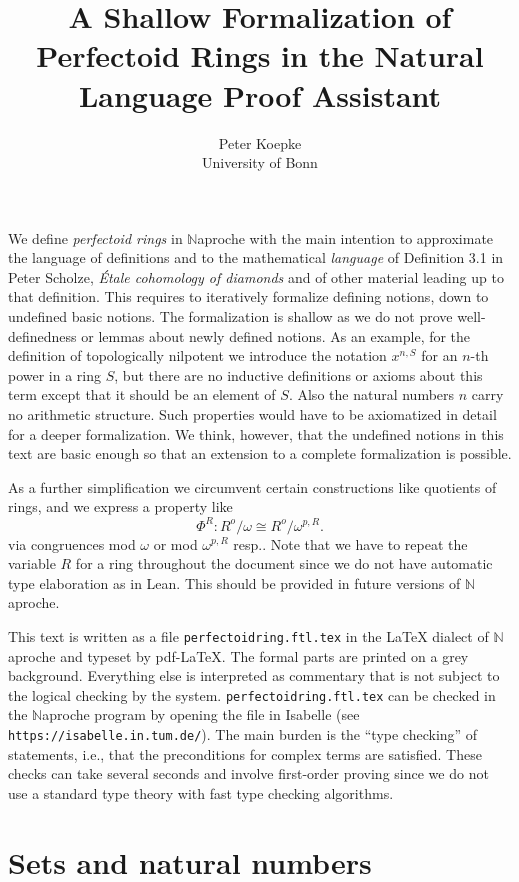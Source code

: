 \documentclass{article}
\title{A Shallow Formalization of Perfectoid Rings in the
\Naproche{} Natural Language Proof Assistant}
\author{Peter Koepke\\
University of Bonn}
\newcommand{\Naproche}{$\mathbb{N}$aproche}
\begin{document}
\maketitle

We define \textit{perfectoid rings} in \Naproche{} with the main intention to approximate
the language of definitions and
to the mathematical \textit{language} of Definition 3.1 in
Peter Scholze, \textit{Étale cohomology of diamonds} and of other material leading up
to that definition.
This requires to iteratively formalize
defining notions, down to undefined basic notions.
The formalization is shallow as we do not prove well-definedness or lemmas about
newly defined notions. As an example, for the definition of topologically nilpotent
we introduce the notation $x^{n,S}$ for an $n$-th power in a ring $S$, but there are
no inductive definitions or axioms about this term except that it should be an element
of $S$. Also the natural numbers $n$ carry no arithmetic structure.
Such properties would have to be axiomatized in detail for a deeper formalization.
We think, however, that the undefined notions in this text are basic enough so that an
extension to a complete formalization is possible.

As a further simplification we circumvent certain constructions like quotients of rings,
and we express a property like
\[ \Phi^{R} : R^o / \omega \cong R^o / \omega^{p,R}. \]
via congruences mod $\omega$ or mod $\omega^{p,R}$ resp.. Note that we
have to repeat the variable $R$ for a ring throughout the document since
we do not have automatic type elaboration as in Lean. This should be
provided in future versions of \Naproche{}.

This text is written as a file
\texttt{perfectoidring.ftl.tex}
in the \LaTeX{} dialect of \Naproche{} and
typeset by pdf-\LaTeX. The formal parts are printed on a grey background. Everything else
is interpreted as commentary that is not subject to the logical checking by the system.
\texttt{perfectoidring.ftl.tex}
can be checked in the \Naproche{} program by opening the file in Isabelle (see
\texttt{https://isabelle.in.tum.de/}).
The main burden is the ``type checking'' of statements, i.e., that the preconditions
for complex terms are satisfied. These checks can take several seconds and involve
first-order proving since we do not use a standard type theory with fast type checking
algorithms.


\section{Sets and natural numbers}
\end{document}
